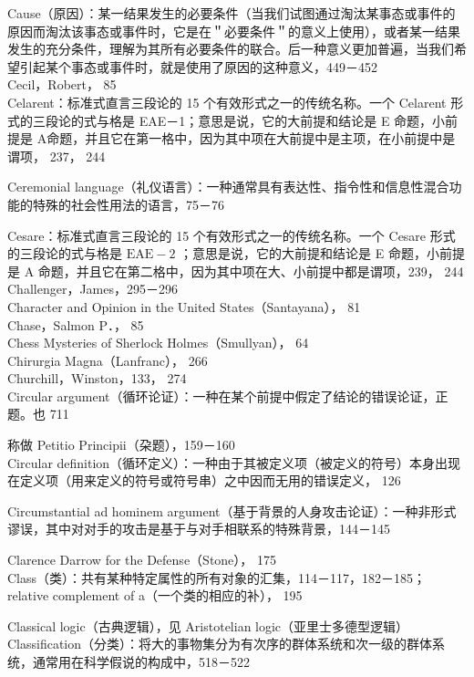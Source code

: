 Cause（原因）：某一结果发生的必要条件（当我们试图通过淘汰某事态或事件的原因而淘汰该事态或事件时，它是在＂必要条件＂的意义上使用），或者某一结果发生的充分条件，理解为其所有必要条件的联合。后一种意义更加普遍，当我们希望引起某个事态或事件时，就是使用了原因的这种意义，449－452\\
Cecil，Robert， 85\\
Celarent：标准式直言三段论的 15 个有效形式之一的传统名称。一个 Celarent 形式的三段论的式与格是 EAE－1；意思是说，它的大前提和结论是 E 命题，小前提是 A命题，并且它在第一格中，因为其中项在大前提中是主项，在小前提中是谓项， 237， 244

Ceremonial language（礼仪语言）：一种通常具有表达性、指令性和信息性混合功能的特殊的社会性用法的语言，75－76

Cesare：标准式直言三段论的 15 个有效形式之一的传统名称。一个 Cesare 形式的三段论的式与格是 $\mathrm{EAE}-2$ ；意思是说，它的大前提和结论是 E 命题，小前提是 A 命题，并且它在第二格中，因为其中项在大、小前提中都是谓项，239， 244\\
Challenger，James，295－296\\
Character and Opinion in the United States（Santayana）， 81\\
Chase，Salmon P．， 85\\
Chess Mysteries of Sherlock Holmes（Smullyan）， 64\\
Chirurgia Magna（Lanfranc）， 266\\
Churchill，Winston，133， 274\\
Circular argument（循环论证）：一种在某个前提中假定了结论的错误论证，正题。也 711

称做 Petitio Principii（朶题），159－160\\
Circular definition（循环定义）：一种由于其被定义项（被定义的符号）本身出现在定义项（用来定义的符号或符号串）之中因而无用的错误定义， 126

Circumstantial ad hominem argument（基于背景的人身攻击论证）：一种非形式谬误，其中对对手的攻击是基于与对手相联系的特殊背景，144－145

Clarence Darrow for the Defense（Stone）， 175\\
Class（类）：共有某种特定属性的所有对象的汇集，114－117，182－185； relative complement of a（一个类的相应的补）， 195

Classical logic（古典逻辑），见 Aristotelian logic（亚里士多德型逻辑）\\
Classification（分类）：将大的事物集分为有次序的群体系统和次一级的群体系统，通常用在科学假说的构成中，518－522

